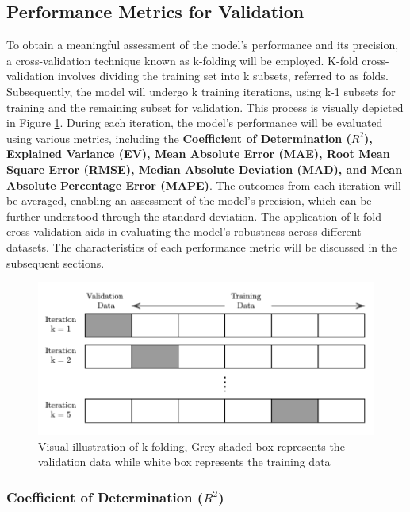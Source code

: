 \subsection{Performance Metrics for Validation}\label{sec:perf_metrics}

To obtain a meaningful assessment of the model's performance and its precision, a cross-validation technique known as k-folding will be employed. K-fold cross-validation involves dividing the training set into k subsets, referred to as folds. Subsequently, the model will undergo k training iterations, using k-1 subsets for training and the remaining subset for validation. This process is visually depicted in Figure \ref{fig:kfold}. During each iteration, the model's performance will be evaluated using various metrics, including the \textbf{Coefficient of Determination ($R^2$), Explained Variance (EV), Mean Absolute Error (MAE), Root Mean Square Error (RMSE), Median Absolute Deviation (MAD), and Mean Absolute Percentage Error (MAPE)}. The outcomes from each iteration will be averaged, enabling an assessment of the model's precision, which can be further understood through the standard deviation. The application of k-fold cross-validation aids in evaluating the model's robustness across different datasets. The characteristics of each performance metric will be discussed in the subsequent sections.\\

\begin{figure}
    \centering
    \includegraphics[width=.85\textwidth]{02_figures/kfold.png}
    \caption{Visual illustration of k-folding, Grey shaded box represents the validation data while white box represents the training data}
    \label{fig:kfold}
\end{figure}

\subsubsection*{Coefficient of Determination ({$R^2$})}\label{sec:rsquared}

